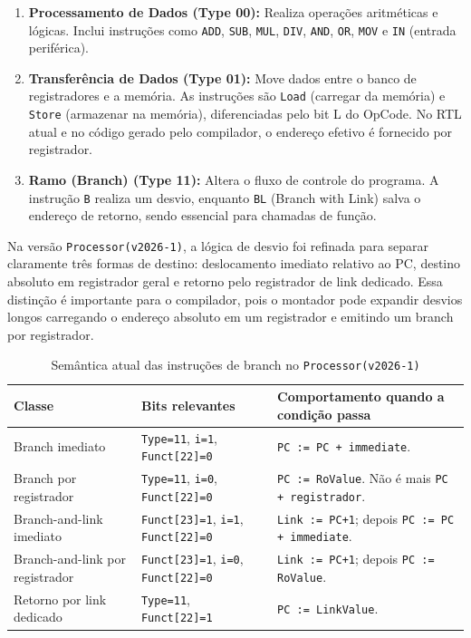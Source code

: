 \documentclass[
	12pt,				%
	oneside,
	a4paper,			%
	english,			%
	french,				%
	spanish,			%
	brazil,				%
	]{abntex2}
\begin{document}
\begin{enumerate}
    \item \textbf{Processamento de Dados (Type 00):} Realiza operações aritméticas e lógicas. Inclui instruções como \texttt{ADD}, \texttt{SUB}, \texttt{MUL}, \texttt{DIV}, \texttt{AND}, \texttt{OR}, \texttt{MOV} e \texttt{IN} (entrada periférica).
    \item \textbf{Transferência de Dados (Type 01):} Move dados entre o banco de registradores e a memória. As instruções são \texttt{Load} (carregar da memória) e \texttt{Store} (armazenar na memória), diferenciadas pelo bit L do OpCode. No RTL atual e no código gerado pelo compilador, o endereço efetivo é fornecido por registrador.
    \item \textbf{Ramo (Branch) (Type 11):} Altera o fluxo de controle do programa. A instrução \texttt{B} realiza um desvio, enquanto \texttt{BL} (Branch with Link) salva o endereço de retorno, sendo essencial para chamadas de função.
\end{enumerate}

Na versão \texttt{Processor(v2026-1)}, a lógica de desvio foi refinada para separar claramente três formas de destino: deslocamento imediato relativo ao PC, destino absoluto em registrador geral e retorno pelo registrador de link dedicado. Essa distinção é importante para o compilador, pois o montador pode expandir desvios longos carregando o endereço absoluto em um registrador e emitindo um branch por registrador.

\begin{table}[H]
    \centering
    \ABNTEXfontereduzida
    \caption{Semântica atual das instruções de branch no \texttt{Processor(v2026-1)}}
    \label{tab:branch_processor}
    \begin{tabular}{|p{}|p{}|p{}|}
        \hline
        \textbf{Classe} & \textbf{Bits relevantes} & \textbf{Comportamento quando a condição passa} \\
        \hline
        Branch imediato & \texttt{Type=11}, \texttt{i=1}, \texttt{Funct[22]=0} & \texttt{PC := PC + immediate}. \\
        \hline
        Branch por registrador & \texttt{Type=11}, \texttt{i=0}, \texttt{Funct[22]=0} & \texttt{PC := RoValue}. Não é mais \texttt{PC + registrador}. \\
        \hline
        Branch-and-link imediato & \texttt{Funct[23]=1}, \texttt{i=1}, \texttt{Funct[22]=0} & \texttt{Link := PC+1}; depois \texttt{PC := PC + immediate}. \\
        \hline
        Branch-and-link por registrador & \texttt{Funct[23]=1}, \texttt{i=0}, \texttt{Funct[22]=0} & \texttt{Link := PC+1}; depois \texttt{PC := RoValue}. \\
        \hline
        Retorno por link dedicado & \texttt{Type=11}, \texttt{Funct[22]=1} & \texttt{PC := LinkValue}. \\
        \hline
    \end{tabular}
\end{table}
\end{document}
